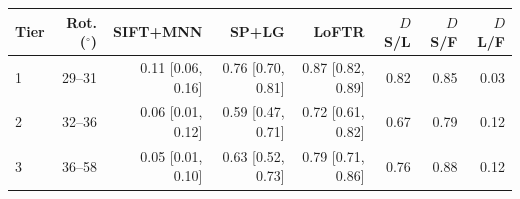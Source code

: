 \begin{tabular}{lrrrrrrr}
\toprule
Tier & Rot. ($^\circ$) & SIFT+MNN & SP+LG & LoFTR & $D$ S/L & $D$ S/F & $D$ L/F \\
\midrule
1 & 29--31 & 0.11 [0.06, 0.16] & 0.76 [0.70, 0.81] & 0.87 [0.82, 0.89] & 0.82 & 0.85 & 0.03 \\
2 & 32--36 & 0.06 [0.01, 0.12] & 0.59 [0.47, 0.71] & 0.72 [0.61, 0.82] & 0.67 & 0.79 & 0.12 \\
3 & 36--58 & 0.05 [0.01, 0.10] & 0.63 [0.52, 0.73] & 0.79 [0.71, 0.86] & 0.76 & 0.88 & 0.12 \\
\bottomrule
\end{tabular}